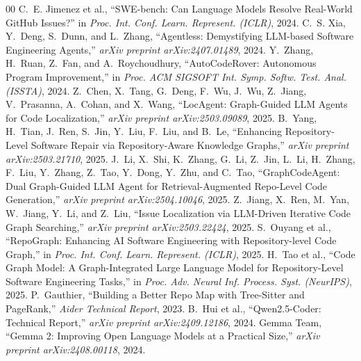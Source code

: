 \documentclass[conference]{IEEEtran}
\begin{document}

\begin{thebibliography}{00}
\setlength{\itemsep}{1.5pt plus 0.5pt minus 0.5pt}
 C.~E. Jimenez et al., ``SWE-bench: Can Language Models Resolve Real-World GitHub Issues?'' in \textit{Proc. Int. Conf. Learn. Represent. (ICLR)}, 2024.
 C.~S. Xia, Y.~Deng, S.~Dunn, and L.~Zhang, ``Agentless: Demystifying LLM-based Software Engineering Agents,'' \textit{arXiv preprint arXiv:2407.01489}, 2024.
 Y.~Zhang, H.~Ruan, Z.~Fan, and A.~Roychoudhury, ``AutoCodeRover: Autonomous Program Improvement,'' in \textit{Proc. ACM SIGSOFT Int. Symp. Softw. Test. Anal. (ISSTA)}, 2024.
 Z.~Chen, X.~Tang, G.~Deng, F.~Wu, J.~Wu, Z.~Jiang, V.~Prasanna, A.~Cohan, and X.~Wang, ``LocAgent: Graph-Guided LLM Agents for Code Localization,'' \textit{arXiv preprint arXiv:2503.09089}, 2025.
 B.~Yang, H.~Tian, J.~Ren, S.~Jin, Y.~Liu, F.~Liu, and B.~Le, ``Enhancing Repository-Level Software Repair via Repository-Aware Knowledge Graphs,'' \textit{arXiv preprint arXiv:2503.21710}, 2025.
 J.~Li, X.~Shi, K.~Zhang, G.~Li, Z.~Jin, L.~Li, H.~Zhang, F.~Liu, Y.~Zhang, Z.~Tao, Y.~Dong, Y.~Zhu, and C.~Tao, ``GraphCodeAgent: Dual Graph-Guided LLM Agent for Retrieval-Augmented Repo-Level Code Generation,'' \textit{arXiv preprint arXiv:2504.10046}, 2025.
 Z.~Jiang, X.~Ren, M.~Yan, W.~Jiang, Y.~Li, and Z.~Liu, ``Issue Localization via LLM-Driven Iterative Code Graph Searching,'' \textit{arXiv preprint arXiv:2503.22424}, 2025.
 S.~Ouyang et al., ``RepoGraph: Enhancing AI Software Engineering with Repository-level Code Graph,'' in \textit{Proc. Int. Conf. Learn. Represent. (ICLR)}, 2025.
 H.~Tao et al., ``Code Graph Model: A Graph-Integrated Large Language Model for Repository-Level Software Engineering Tasks,'' in \textit{Proc. Adv. Neural Inf. Process. Syst. (NeurIPS)}, 2025.
 P.~Gauthier, ``Building a Better Repo Map with Tree-Sitter and PageRank,'' \textit{Aider Technical Report}, 2023.
 B.~Hui et al., ``Qwen2.5-Coder: Technical Report,'' \textit{arXiv preprint arXiv:2409.12186}, 2024.
 Gemma Team, ``Gemma 2: Improving Open Language Models at a Practical Size,'' \textit{arXiv preprint arXiv:2408.00118}, 2024.
\end{thebibliography}
\end{document}
